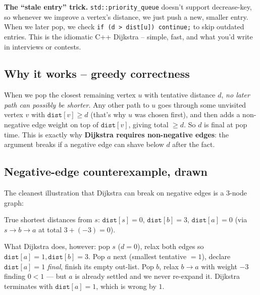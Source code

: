 \documentclass[11pt]{article}
\begin{document}
\begin{warnbox}
\textbf{The ``stale entry'' trick.} \texttt{std::priority\_queue} doesn't support decrease-key, so whenever we improve a vertex's distance, we just push a new, smaller entry. When we later pop, we check \texttt{if (d > dist[u]) continue;} to skip outdated entries. This is the idiomatic C++ Dijkstra -- simple, fast, and what you'd write in interviews or contests.
\end{warnbox}

\subsection*{Why it works -- greedy correctness}

\begin{ideabox}
When we pop the closest remaining vertex $u$ with tentative distance $d$, \emph{no later path can possibly be shorter}. Any other path to $u$ goes through some unvisited vertex $v$ with $\texttt{dist}[v] \geq d$ (that's why $u$ was chosen first), and then adds a non-negative edge weight on top of $\texttt{dist}[v]$, giving total $\geq d$. So $d$ is final at pop time. This is exactly why \textbf{Dijkstra requires non-negative edges}: the argument breaks if a negative edge can shave below $d$ after the fact.
\end{ideabox}

\subsection*{Negative-edge counterexample, drawn}

The cleanest illustration that Dijkstra can break on negative edges
is a 3-node graph:

\begin{center}
\end{center}

True shortest distances from $s$: $\texttt{dist}[s] = 0$,
$\texttt{dist}[b] = 3$, $\texttt{dist}[a] = 0$ (via
$s \to b \to a$ at total $3 + (-3) = 0$).

What Dijkstra does, however: pop $s$ ($d = 0$), relax both edges so
$\texttt{dist}[a] = 1, \texttt{dist}[b] = 3$. Pop $a$ next (smallest
tentative $= 1$), declare $\texttt{dist}[a] = 1$ \emph{final}, finish
its empty out-list. Pop $b$, relax $b \to a$ with weight $-3$
finding $0 < 1$ --- but $a$ is already settled and we never
re-expand it. Dijkstra terminates with $\texttt{dist}[a] = 1$,
which is wrong by $1$.
\end{document}
